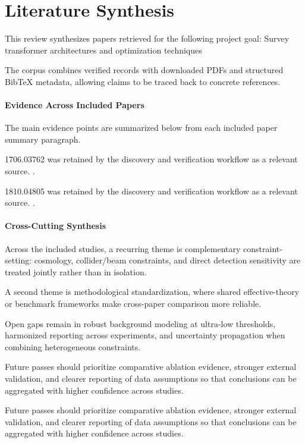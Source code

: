 \documentclass[11pt]{article}
\begin{document}
\section*{Literature Synthesis}

This review synthesizes papers retrieved for the following project goal: Survey transformer architectures and optimization techniques

The corpus combines verified records with downloaded PDFs and structured BibTeX metadata, allowing claims to be traced back to concrete references.

\paragraph*{Evidence Across Included Papers}

The main evidence points are summarized below from each included paper summary paragraph.

1706.03762 was retained by the discovery and verification workflow as a relevant source. \cite{arxiv1900170603762}.

1810.04805 was retained by the discovery and verification workflow as a relevant source. \cite{arxiv1900181004805}.

\paragraph*{Cross-Cutting Synthesis}

Across the included studies, a recurring theme is complementary constraint-setting: cosmology, collider/beam constraints, and direct detection sensitivity are treated jointly rather than in isolation.

A second theme is methodological standardization, where shared effective-theory or benchmark frameworks make cross-paper comparison more reliable.

Open gaps remain in robust background modeling at ultra-low thresholds, harmonized reporting across experiments, and uncertainty propagation when combining heterogeneous constraints.

Future passes should prioritize comparative ablation evidence, stronger external validation, and clearer reporting of data assumptions so that conclusions can be aggregated with higher confidence across studies.

Future passes should prioritize comparative ablation evidence, stronger external validation, and clearer reporting of data assumptions so that conclusions can be aggregated with higher confidence across studies.
\end{document}
